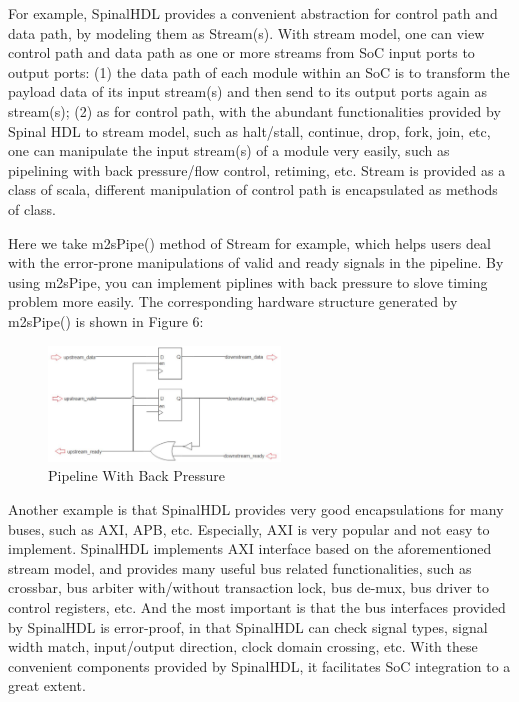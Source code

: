 \documentclass{article}
\begin{document}
For example, SpinalHDL provides a convenient abstraction for control path and data path, by modeling them as Stream(s). With stream model, one can view control path and data path as one or more streams from SoC input ports to output ports: (1) the data path of each module within an SoC is to transform the payload data of its input stream(s) and then send to its output ports again as stream(s); (2) as for control path, with the abundant functionalities provided by Spinal HDL to stream model, such as halt/stall, continue, drop, fork, join, etc, one can manipulate the input stream(s) of a module very easily, such as pipelining with back pressure/flow control, retiming, etc. Stream is provided as a class of scala, different manipulation of control path is encapsulated as methods of class. 

Here we take m2sPipe() method of Stream for example, which helps users deal with the error-prone manipulations of valid and ready signals in the pipeline. By using m2sPipe, you can implement piplines with back pressure to slove timing problem more easily. The corresponding hardware structure generated by m2sPipe() is shown in Figure 6:
\begin{figure}[hbt]
\centering
\includegraphics[width=0.55\textwidth]{pipeline.jpg}
\caption{\label{fig:pipeline}Pipeline With Back Pressure}
\end{figure}

Another example is that SpinalHDL provides very good encapsulations for many buses, such as AXI, APB, etc. Especially, AXI is very popular and not easy to implement. SpinalHDL implements AXI interface based on the aforementioned stream model, and provides many useful bus related functionalities, such as crossbar, bus arbiter with/without transaction lock, bus de-mux, bus driver to control registers, etc. And the most important is that the bus interfaces provided by SpinalHDL is error-proof, in that SpinalHDL can check signal types, signal width match, input/output direction, clock domain crossing, etc. With these convenient components provided by SpinalHDL, it facilitates SoC integration to a great extent.
\end{document}
